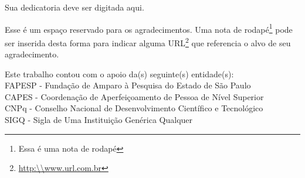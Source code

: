 \documentclass[
  12pt,		%
  a4paper,	%
  openright,%
  oneside,	%
  chapter=TITLE,		%
  section=TITLE,		%
  english,	%
  french,	%
  spanish,	%
  brazil	%
]{abntex2}
\begin{document}
    
    \begin{dedicatoria}
        \vspace*{\fill}
        \begin{flushright}
            Sua dedicatoria deve ser digitada aqui.
        \end{flushright}
        \vspace*{1cm}
    \end{dedicatoria}

    \begin{agradecimentos}
    
        Esse é um espaço reservado para os agradecimentos. Uma nota de rodapé\footnote{Essa é uma nota de rodapé} pode ser inserida desta forma para indicar alguma URL\footnote{\url{http:\\www.url.com.br}} que referencia o alvo de seu agradecimento.
    
    \end{agradecimentos}
    
    \vspace*{\fill}
    \begin{flushleft}
        Este trabalho contou com o apoio da(s) seguinte(s) entidade(s):\\
        FAPESP - Fundação de Amparo à Pesquisa do Estado de São Paulo\\
        CAPES - Coordenação de Aperfeiçoamento de Pessoa de Nível Superior\\
        CNPq - Conselho Nacional de Desenvolvimento Científico e Tecnológico\\
        SIGQ - Sigla de Uma Instituição Genérica Qualquer
    \end{flushleft}
    \newpage
    
\end{document}
